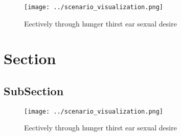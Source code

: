 \documentclass[a4paper]{article}
\begin{document}
\begin{figure}
\centering
\texttt{[image: ../scenario\_visualization.png]}
\caption{Eectively through hunger thirst ear sexual desire
}
\end{figure}
 
\section{Section}

\subsection{SubSection}

\begin{figure}
\centering
\texttt{[image: ../scenario\_visualization.png]}
\caption{Eectively through hunger thirst ear sexual desire
}
\end{figure}
 
\end{document}
